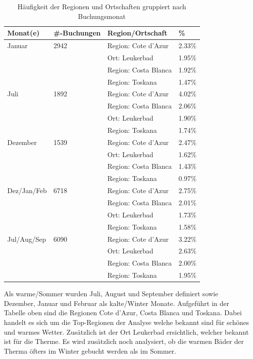 \begin{table}[H] 
	\caption{Häufigkeit der Regionen und Ortschaften gruppiert nach Buchungsmonat}
	\centering
	\label{fig:testingfazit:testing:hypothesen:6}
	\begin{tabular}{ | l | l | l | l | } 
		\hline 
		\rowcolor{tableheadcolor}
		\bfseries Monat(e) & \bfseries \#-Buchungen & \bfseries Region/Ortschaft & \bfseries \% \\ \hline 
		Januar & 2942 & Region: Cote d'Azur & 2.33\% \\ \cline{3-4} 
		 & & Ort: Leukerbad & 1.95\% \\ \cline{3-4}
		 & & Region: Costa Blanca & 1.92\% \\ \cline{3-4}
		 & & Region: Toskana & 1.47\% \\ \hline
		 Juli & 1892 & Region: Cote d'Azur & 4.02\% \\ \cline{3-4} 
 		 & & Region: Costa Blanca & 2.06\% \\ \cline{3-4}
 		 & & Ort: Leukerbad & 1.90\% \\ \cline{3-4}
 		 & & Region: Toskana & 1.74\% \\ \hline
		 Dezember & 1539 & Region: Cote d'Azur & 2.47\% \\ \cline{3-4} 
		 & & Ort: Leukerbad & 1.62\% \\ \cline{3-4}
 		 & & Region: Costa Blanca & 1.43\% \\ \cline{3-4}
 		 & & Region: Toskana & 0.97\% \\ \hline
		 Dez/Jan/Feb & 6718 & Region: Cote d'Azur & 2.75\% \\ \cline{3-4} 
 		 & & Region: Costa Blanca & 2.01\% \\ \cline{3-4}
 		 & & Ort: Leukerbad & 1.73\% \\ \cline{3-4}
 		 & & Region: Toskana & 1.58\% \\ \hline
		 Jul/Aug/Sep & 6090 & Region: Cote d'Azur & 3.22\% \\ \cline{3-4} 
		 & & Ort: Leukerbad & 2.63\% \\ \cline{3-4}
 		 & & Region: Costa Blanca & 2.00\% \\ \cline{3-4}
 		 & & Region: Toskana & 1.95\% \\ \hline		 
	\end{tabular}
\end{table}

Als warme/Sommer wurden Juli, August und September definiert sowie Dezember, Januar und Februar als kalte/Winter Monate. Aufgeführt in der Tabelle oben sind die Regionen Cote d'Azur, Costa Blanca und Toskana. Dabei handelt es sich um die Top-Regionen der Analyse welche bekannt sind für schönes und warmes Wetter. Zusätzlich ist der Ort Leukerbad ersichtlich, welcher bekannt ist für die Therme. Es wird zusätzlich noch analysiert, ob die warmen Bäder der Therma öfters im Winter gebucht werden als im Sommer.

